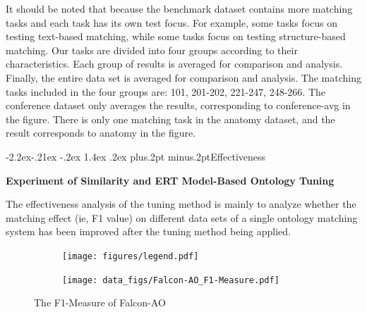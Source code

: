 \documentclass[twoside]{article}
\makeatletter
\def\subsubsection{\@startsection{subsubsection}{3}{\z@}%
 {-2.2ex\@plus -.21ex \@minus -.2ex}%
 {1.4ex \@plus.2ex}
{\normalfont\normalsize\protect\baselineskip=12pt plus.2pt minus.2pt\sl}}
\makeatother
\begin{document}
It should be noted that because the benchmark dataset contains more matching tasks and each task has its own test focus.
For example, some tasks focus on testing text-based matching, while some tasks focus on testing structure-based matching.
Our tasks are divided into four groups according to their characteristics.
Each group of results is averaged for comparison and analysis.
Finally, the entire data set is averaged for comparison and analysis.
The matching tasks included in the four groups are: 101, 201-202, 221-247, 248-266.
The conference dataset only averages the results, corresponding to conference-avg in the figure.
There is only one matching task in the anatomy dataset, and the result corresponds to anatomy in the figure.


\subsubsection{Effectiveness}

{\bf Experiment of Similarity and ERT Model-Based Ontology Tuning}

The effectiveness analysis of the tuning method is mainly to analyze whether the matching effect (ie, F1 value) on different data sets of a single ontology matching system has been improved after the tuning method being applied.

\begin{figure}[htb!]
\centering
\begin{subfigure}{\textwidth}
\centering
\texttt{[image: figures/legend.pdf]}
\end{subfigure}

\begin{subfigure}{0.5\textwidth}
	\centering
	\texttt{[image: data\_figs/Falcon-AO\_F1-Measure.pdf]}
\end{subfigure}
\caption{The F1-Measure of Falcon-AO}
\label{fig:Falcon-AO_F1-Measure}
\end{figure}
\end{document}
